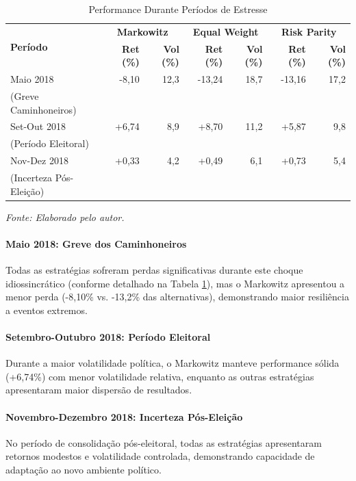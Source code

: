 \begin{table}[H]
\centering
\caption{Performance Durante Períodos de Estresse}
\begin{tabular}{|l|r|r|r|r|r|r|}
\hline
\multirow{2}{*}{\textbf{Período}} & \multicolumn{2}{c|}{\textbf{Markowitz}} & \multicolumn{2}{c|}{\textbf{Equal Weight}} & \multicolumn{2}{c|}{\textbf{Risk Parity}} \\
\cline{2-7}
& \textbf{Ret (\%)} & \textbf{Vol (\%)} & \textbf{Ret (\%)} & \textbf{Vol (\%)} & \textbf{Ret (\%)} & \textbf{Vol (\%)} \\
\hline
Maio 2018 & -8,10 & 12,3 & -13,24 & 18,7 & -13,16 & 17,2 \\
(Greve Caminhoneiros) & & & & & & \\
\hline
Set-Out 2018 & +6,74 & 8,9 & +8,70 & 11,2 & +5,87 & 9,8 \\
(Período Eleitoral) & & & & & & \\
\hline
Nov-Dez 2018 & +0,33 & 4,2 & +0,49 & 6,1 & +0,73 & 5,4 \\
(Incerteza Pós-Eleição) & & & & & & \\
\hline
\end{tabular}
\textit{Fonte: Elaborado pelo autor.}
\label{tab:stress_periods}
\end{table}

\paragraph{Maio 2018: Greve dos Caminhoneiros}
Todas as estratégias sofreram perdas significativas durante este choque idiossincrático (conforme detalhado na Tabela \ref{tab:stress_periods}), mas o Markowitz apresentou a menor perda (-8,10\% vs. -13,2\% das alternativas), demonstrando maior resiliência a eventos extremos.

\paragraph{Setembro-Outubro 2018: Período Eleitoral}
Durante a maior volatilidade política, o Markowitz manteve performance sólida (+6,74\%) com menor volatilidade relativa, enquanto as outras estratégias apresentaram maior dispersão de resultados.

\paragraph{Novembro-Dezembro 2018: Incerteza Pós-Eleição}
No período de consolidação pós-eleitoral, todas as estratégias apresentaram retornos modestos e volatilidade controlada, demonstrando capacidade de adaptação ao novo ambiente político.

